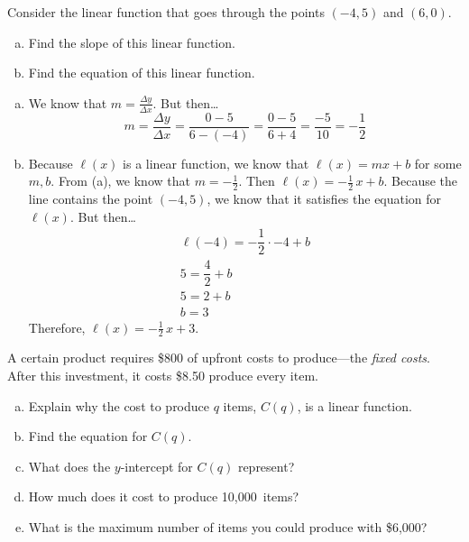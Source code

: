 \documentclass[11pt,letterpaper]{article}
\begin{document}
\newpage



 Consider the linear function that goes through the points $(-4, 5)$ and $(6, 0)$.
	\begin{enumerate}[(a)]
	\item Find the slope of this linear function.
	\item Find the equation of this linear function.
	\end{enumerate} \pspace

\sol 
\begin{enumerate}[(a)]
\item We know that $m= \frac{\Delta y}{\Delta x}$. But then\dots
	\[
	m= \dfrac{\Delta y}{\Delta x}= \dfrac{0 - 5}{6 - (-4)}= \dfrac{0 - 5}{6 + 4}= \dfrac{-5}{10}= -\dfrac{1}{2}
	\] \pspace

\item Because $\ell(x)$ is a linear function, we know that $\ell(x)= mx + b$ for some $m, b$. From (a), we know that $m= -\frac{1}{2}$. Then $\ell(x)= -\frac{1}{2}\, x + b$. Because the line contains the point $(-4, 5)$, we know that it satisfies the equation for $\ell(x)$. But then\dots
	\[
	\begin{gathered}
	\ell(-4)= -\dfrac{1}{2} \cdot -4 + b \\
	5= \dfrac{4}{2} + b \\
	5= 2 + b \\
	b= 3
	\end{gathered}
	\]
Therefore, $\ell(x)= -\frac{1}{2}\, x + 3$. 
\end{enumerate}



\newpage



 A certain product requires \$800 of upfront costs to produce---the \textit{fixed costs}. After this investment, it costs \$8.50 produce every item. 
	\begin{enumerate}[(a)]
	\item Explain why the cost to produce $q$ items, $C(q)$, is a linear function.
	\item Find the equation for $C(q)$.
	\item What does the $y$-intercept for $C(q)$ represent?
	\item How much does it cost to produce 10,000~items?
	\item What is the maximum number of items you could produce with \$6,000?
	\end{enumerate} \pspace
\end{document}
